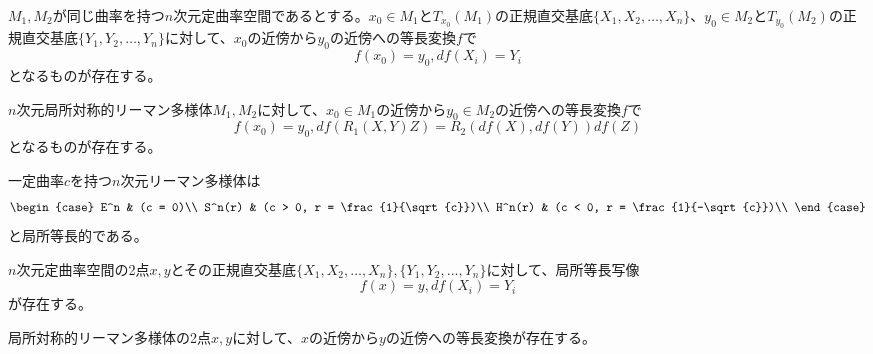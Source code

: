    \begin{thm}
        $M_1, M_2$が同じ曲率を持つ$n$次元定曲率空間であるとする。$x_0 \in M_1$と$T_{x_0}(M_1)$の正規直交基底$\{X_1, X_2, \dots, X_n\}$、$y_0 \in M_2$と$T_{y_0}(M_2)$の正規直交基底$\{Y_1, Y_2, \dots, Y_n\}$に対して、$x_0$の近傍から$y_0$の近傍への等長変換$f$で
            \[f(x_0) = y_0, df(X_i) = Y_i\]
        となるものが存在する。
    \end{thm}
    \begin{thm}
        $n$次元局所対称的リーマン多様体$M_1, M_2$に対して、$x_0 \in M_1$の近傍から$y_0 \in M_2$の近傍への等長変換$f$で
            \[f(x_0) = y_0, df(R_1(X, Y)Z) = R_2(df(X), df(Y))df(Z)\]
        となるものが存在する。
    \end{thm}
    \begin{cor}
        一定曲率$c$を持つ$n$次元リーマン多様体は
        \[\begin{case}
            E^n & (c = 0)\\
            S^n(r) & (c > 0, r = \frac{1}{\sqrt{c}})\\
            H^n(r) & (c < 0, r = \frac{1}{-\sqrt{c}})\\
        \end{case}\]
        と局所等長的である。
    \end{cor}
    \begin{cor}
        $n$次元定曲率空間の2点$x, y$とその正規直交基底$\{X_1, X_2, \dots, X_n\}, \{Y_1, Y_2, \dots, Y_n\}$に対して、局所等長写像
            \[f(x) = y, df(X_i) = Y_i\]
        が存在する。
    \end{cor}
    \begin{cor}
        局所対称的リーマン多様体の2点$x, y$に対して、$x$の近傍から$y$の近傍への等長変換が存在する。
    \end{cor}